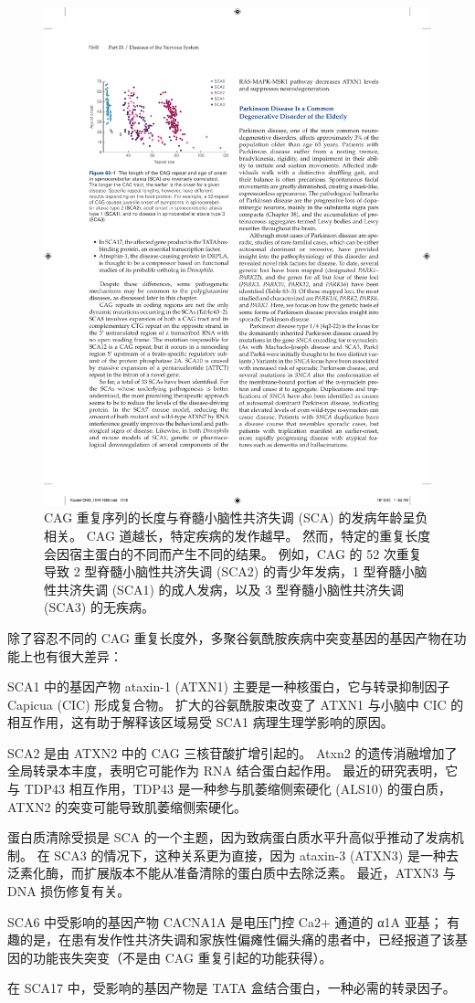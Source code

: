 \begin{figure}[htbp]
	\centering
	\includegraphics[width=0.5\linewidth]{chap63/fig_63_1}
	\caption{CAG 重复序列的长度与脊髓小脑性共济失调 (SCA) 的发病年龄呈负相关。 CAG 道越长，特定疾病的发作越早。 然而，特定的重复长度会因宿主蛋白的不同而产生不同的结果。 例如，CAG 的 52 次重复导致 2 型脊髓小脑性共济失调 (SCA2) 的青少年发病，1 型脊髓小脑性共济失调 (SCA1) 的成人发病，以及 3 型脊髓小脑性共济失调 (SCA3) 的无疾病。}
	\label{fig:63_1}
\end{figure}

除了容忍不同的 CAG 重复长度外，多聚谷氨酰胺疾病中突变基因的基因产物在功能上也有很大差异：

SCA1 中的基因产物 ataxin-1 (ATXN1) 主要是一种核蛋白，它与转录抑制因子 Capicua (CIC) 形成复合物。 扩大的谷氨酰胺束改变了 ATXN1 与小脑中 CIC 的相互作用，这有助于解释该区域易受 SCA1 病理生理学影响的原因。

SCA2 是由 ATXN2 中的 CAG 三核苷酸扩增引起的。 Atxn2 的遗传消融增加了全局转录本丰度，表明它可能作为 RNA 结合蛋白起作用。 最近的研究表明，它与 TDP43 相互作用，TDP43 是一种参与肌萎缩侧索硬化 (ALS10) 的蛋白质，ATXN2 的突变可能导致肌萎缩侧索硬化。

蛋白质清除受损是 SCA 的一个主题，因为致病蛋白质水平升高似乎推动了发病机制。 在 SCA3 的情况下，这种关系更为直接，因为 ataxin-3 (ATXN3) 是一种去泛素化酶，而扩展版本不能从准备清除的蛋白质中去除泛素。 最近，ATXN3 与 DNA 损伤修复有关。

SCA6 中受影响的基因产物 CACNA1A 是电压门控 Ca2+ 通道的 α1A 亚基； 有趣的是，在患有发作性共济失调和家族性偏瘫性偏头痛的患者中，已经报道了该基因的功能丧失突变（不是由 CAG 重复引起的功能获得）。

在 SCA17 中，受影响的基因产物是 TATA 盒结合蛋白，一种必需的转录因子。 

